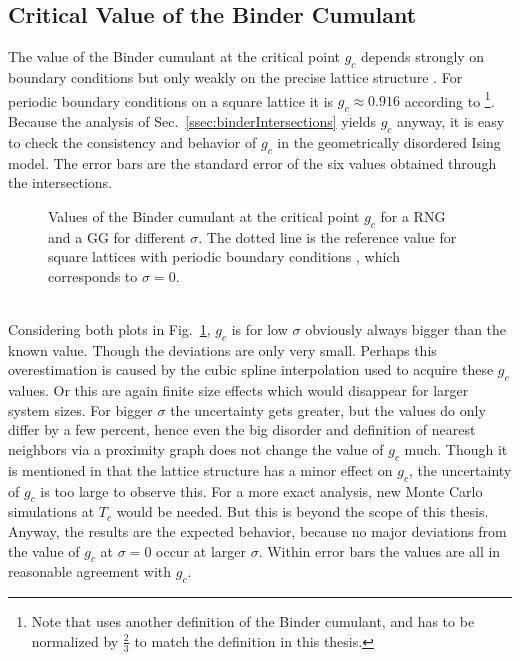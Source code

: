 \subsection{Critical Value of the Binder Cumulant}
    The value of the Binder cumulant at the critical point \(g_c\)
    depends strongly on boundary conditions but only weakly on the precise lattice
    structure \cite{BinderValue}. For periodic boundary conditions on a
    square lattice it is \(g_c \approx 0.916\) according to \cite{BinderValue}
        \footnote{Note that \cite{BinderValue} uses another definition of
            the Binder cumulant, and has to be normalized by \(\frac{2}{3}\)
            to match the definition in this thesis.}.
    Because the analysis of Sec.\ \ref{ssec:binderIntersections}
    yields \(g_c\) anyway, it is easy to check the consistency and
    behavior of \(g_c\) in the geometrically disordered Ising model.
    The error bars are the standard error of the six values obtained
    through the intersections.\\
    \begin{figure}[htbp]
        \centering
        \caption[Values of the Binder Cumulant at the Critical Point $g_c$]
        {
            Values of the Binder cumulant at the critical point \(g_c\)
            for
             a RNG and
             a GG for different \(\sigma\).
            The dotted line is the reference value for square lattices
            with periodic boundary conditions \cite{BinderValue}, which
            corresponds to \(\sigma = 0\).
        }
        \label{fig:TcG}
    \end{figure}\\
    Considering both plots in Fig.\ \ref{fig:TcG}, \(g_c\) is for low
    \(\sigma\) obviously always bigger than the known value. Though the
    deviations are only very small. Perhaps this overestimation is caused
    by the cubic spline interpolation used to acquire these \(g_c\) values.
    Or this are again finite size effects which would disappear for
    larger system sizes.
    For bigger \(\sigma\) the uncertainty gets greater, but the values
    do only differ by a few percent, hence even the big disorder and
    definition of nearest neighbors via a proximity graph does not change
    the value of \(g_c\) much. Though it is mentioned in \cite{BinderValue} that the
    lattice structure has a minor effect on \(g_c\), the uncertainty of
    \(g_c\) is too large to observe this. For a more exact analysis, new
    Monte Carlo simulations at \(T_c\) would be needed. But this is
    beyond the scope of this thesis. Anyway, the results are the expected
    behavior, because no major deviations from the value of \(g_c\) at
    \(\sigma = 0\) occur at larger \(\sigma\). Within error bars the
    values are all in reasonable agreement with \(g_c\).
